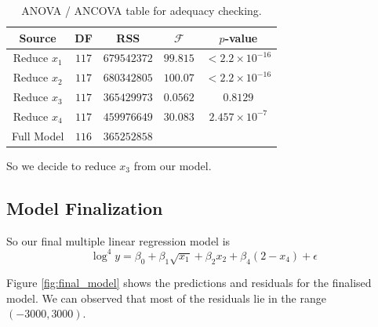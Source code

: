 \begin{table}[ht]
    \centering
    \begin{tabular}{c|c|c|c|c}
    \toprule
        \textbf{Source} & \textbf{DF} & \textbf{RSS} & $\mathcal{F}$ & $p$-value \\
        \midrule
        Reduce $x_1$  & $117$ & $679542372$ & $99.815$ & $< 2.2\times 10^{-16}$\\
        Reduce $x_2$  & $117$ & $680342805$ & $100.07$ & $< 2.2\times 10^{-16}$\\
        Reduce $x_3$  & $117$ & $365429973$ & $0.0562$ & $0.8129$\\
        Reduce $x_4$  & $117$ & $459976649$ & $30.083$ & $2.457\times 10^{-7}$\\
        \midrule
        Full Model & $116$ & $365252858$ & & \\
    \bottomrule
    \end{tabular}
    \caption{ANOVA / ANCOVA table for adequacy checking.}
    \label{tab:mlr_anova}
\end{table}

So we decide to reduce $x_3$ from our model.

\subsection{Model Finalization}

So our final multiple linear regression model is 
\begin{equation}\label{eq:final_mlr}
    \log^4 y = \beta_0 +\beta_1 \sqrt{x_1} + \beta_2 x_2 +\beta_4 (2 - x_4) + \epsilon
\end{equation}

Figure \ref{fig:final_model} shows the predictions and residuals for the finalised model. We can observed that most of the residuals lie in the range $(-3000, 3000)$.


